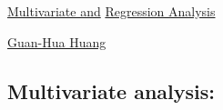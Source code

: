 \documentclass[11pt]{article}
\begin{document}
	\kaishu 
	\setcounter{section}{0}
	\begin{center}
		{\LARGE  \href{https://www.youtube.com/playlist?list=PLj6E8qlqmkFtO5TgUPO1l5I3AQvEVb8gi}{Multivariate and}  \href{https://www.youtube.com/playlist?list=PLj6E8qlqmkFu0cY9PfwoFq6SbuZ-M28JE}{Regression Analysis}}
		
		
		{\large \href{https://ghuang.stat.nycu.edu.tw/}{Guan-Hua Huang}}
	\end{center}
\setcounter{page}{1}


\subsection*{\small Multivariate analysis:}

\vspace{-0.5cm}
\end{document}
